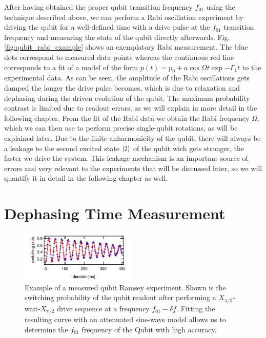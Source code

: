 After having obtained the proper qubit transition frequency $f_{01}$ using the technique described above, we can perform a Rabi oscillation experiment by driving the qubit for a well-defined time with a drive pulse at the $f_{01}$ transition frequency and measuring the state of the qubit directly afterwards. Fig. \ref{fig:qubit_rabi_example} shows an exemplatory Rabi measurement. The blue dots correspond to measured data points whereas the continuous red line corresponds to a fit of a model of the form $p(t)=p_0+a\cos{\Omega t}\exp{-\Gamma_1 t}$ to the experimental data. As can be seen, the amplitude of the Rabi oscillations gets damped the longer the drive pulse becomes, which is due to relaxation and dephasing during the driven evolution of the qubit. The maximum probability contrast is limited due to readout errors, as we will explain in more detail in the following chapter. From the fit of the Rabi data we obtain the Rabi frequency $\Omega$, which we can then use to perform precise single-qubit rotations, as will be explained later. Due to the finite anharmonicity of the qubit, there will always be a leakage to the second excited state $\left| 2 \right>$ of the qubit wich gets stronger, the faster we drive the system. This leakage mechanism is an important source of errors and very relevant to the experiments that will be discussed later, so we will quantify it in detail in the following chapter as well.

\section{Dephasing Time Measurement}

\begin{figure}[ht!]
\centering
\includegraphics[width=0.5\textwidth]{"./data/ct5/2011_04_21 - grover and tomo/example - qubit 2 ramsey"}
\caption[]{Example of a measured qubit Ramsey experiment. Shown is the switching probability of the qubit readout after performing a $X_{\pi/2}$-wait-$X_{\pi/2}$ drive sequence at a frequency $f_{01}-\delta f$. Fitting the resulting curve with an attenuated sine-wave model allows us to determine the $f_{01}$ frequency of the Qubit with high accuracy.}
\label{fig:qubit_ramsey_example}
\end{figure}

